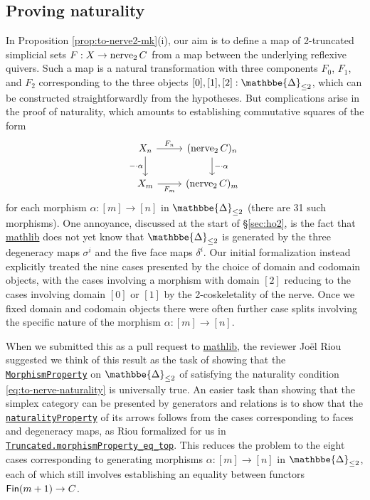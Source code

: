 \documentclass[a4paper,UKenglish,cleveref, autoref, thm-restate]{lipics-v2021}
\newcommand{\nerve}{\textup{nerve}}
\newcommand{\cat}[1]{\textup{\textsf{#1}}}%
\newcommand{\1}{\mathbbe{1}}
\newcommand{\2}{\mathbbe{2}}
\newcommand{\3}{\mathbbe{3}}
\newcommand{\DDelta}{\mathbbe{\Delta}}
\newcommand{\Fin}{\cat{Fin}}
\newcommand{\fixme}[1]{}
\newcommand{\libmathlib}{\href{https://github.com/leanprover-community/mathlib}{\textsf{mathlib}}}
\newcommand{\ldoc}[2][]{\href{https://leanprover-community.github.io/mathlib4_docs/find/?pattern=#1#2\#doc}{\texttt{#2}}}
\newcommand{\cdoc}[2][]{\href{https://leanprover-community.github.io/mathlib4_docs/find/?pattern=CategoryTheory.#1#2\#doc}{\texttt{#2}}}
\newcommand{\cdocTwo}[3][]{\href{https://leanprover-community.github.io/mathlib4_docs/find/?pattern=CategoryTheory.#1#2\%E2\%82\%82#3\#doc}{\texttt{#2${}_2$#3}}}
\begin{document}
\subsection{Proving naturality}\label{sec:naturality}

In Proposition \ref{prop:to-nerve2-mk}(i), our aim is to define a map of 2-truncated simplicial sets $F : X \to \nerve_2\, C$ from a map between the underlying reflexive quivers. Such a map is a natural transformation with three components $F_0$, $F_1$, and $F_2$ corresponding to the three objects $[0], [1], [2] : \DDelta_{\leq 2}$, which can be constructed straightforwardly from the hypotheses. But complications arise in the proof of naturality, which amounts to establishing commutative squares of the form
\begin{equation}\label{eq:to-nerve-naturality}
  \begin{tikzcd} X_n \arrow[r, "F_n"] \arrow[d, "{-\cdot\alpha}"'] & (\nerve_2\,C)_n \arrow[d, "{-\cdot\alpha}"] \\ X_m \arrow[r, "F_m"'] & (\nerve_2\,C)_m  \end{tikzcd}
\end{equation}
for each morphism $\alpha \colon [m] \to [n]$ in $\DDelta_{\leq 2}$ (there are 31 such morphisms). One annoyance, discussed at the start of \S\ref{sec:ho2}, is the fact that \libmathlib{} does not yet know that $\DDelta_{\leq 2}$ is generated by the three degeneracy maps $\sigma^i$ and the five face maps $\delta^i$. Our initial formalization instead explicitly treated the nine cases presented by the choice of domain and codomain objects, with the cases involving a morphism with domain $[2]$ reducing to the cases involving domain $[0]$ or $[1]$ by the 2-coskeletality of the nerve. \fixme{Really what I want to cite here is the fact that \cdocTwo{nerve}{seagull} is a monomorphism but that instance has a horrible name. Can you help?} Once we fixed domain and codomain objects there were often further case splits involving the specific nature of the morphism $\alpha \colon [m] \to [n]$.

When we submitted this as a pull request to \libmathlib{}, the reviewer Jo\"{e}l Riou suggested we think of this result as the task of showing that the \cdoc{MorphismProperty} on $\DDelta_{\leq 2}$ of satisfying the naturality condition \eqref{eq:to-nerve-naturality} is universally true. An easier task than showing that the simplex category can be presented by generators and relations is to show that the \cdoc[MorphismProperty.]{naturalityProperty} of its arrows follows from the cases corresponding to faces and degeneracy maps, as Riou formalized for us in \ldoc[SimplexCategory.]{Truncated.morphismProperty\_eq\_top}. This reduces the problem to the eight cases corresponding to generating morphisms $\alpha \colon [m] \to [n]$ in $\DDelta_{\leq 2}$, each of which still involves establishing an equality between functors $\Fin(m+1) \to C$.
\end{document}
